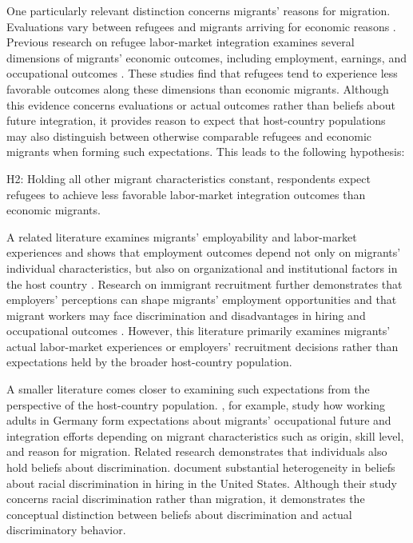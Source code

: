 One particularly relevant distinction concerns migrants’ reasons for migration. Evaluations vary between refugees and 
migrants arriving for economic reasons \citep{czymara2016deutschland}. 
Previous research on refugee labor-market integration examines several dimensions of migrants' economic outcomes, 
including employment, earnings, and occupational outcomes \citep{brell2020labor, fasani2024refugees}. These studies find
that refugees tend to experience less favorable outcomes along these dimensions than economic migrants.
Although this evidence concerns evaluations or actual outcomes 
rather than beliefs about future integration, it provides reason to expect that host-country populations may also 
distinguish between otherwise comparable refugees and economic migrants when forming such expectations. This leads to 
the following hypothesis:\bigskip

H2: Holding all other migrant characteristics constant, respondents expect refugees to achieve less favorable 
labor-market integration outcomes than economic migrants.\bigskip

A related literature examines migrants' employability and labor-market experiences and shows that employment outcomes 
depend not only on migrants' individual characteristics, but also on organizational and institutional factors in the 
host country \citep{shirmohammadi2019understanding, farashah2023perceived}. Research on immigrant recruitment further 
demonstrates that employers’ perceptions can shape migrants’ employment opportunities and that migrant workers may face
discrimination and disadvantages in hiring and occupational outcomes \citep{almeida2015fitting, dietz2015skill}. 
However, this literature primarily examines migrants’ actual labor-market experiences or employers’ recruitment 
decisions rather than expectations held by the broader host-country population.

A smaller literature comes closer to examining such expectations from the perspective of the host-country population. 
\citet{niemann2024long}, for example, study how working adults in Germany form expectations about migrants' occupational 
future and integration efforts depending on migrant characteristics such as origin, skill level, and reason for migration. 
Related research demonstrates that individuals also hold beliefs about discrimination. 
\citet{haaland2023beliefs} document substantial heterogeneity in beliefs about racial discrimination in hiring in the United States.
Although their study concerns racial discrimination rather than migration, it demonstrates the conceptual distinction 
between beliefs about discrimination and actual discriminatory behavior. 

